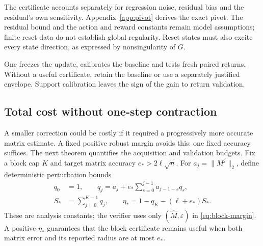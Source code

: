 \documentclass[twocolumn,nameyear]{autart}
\begin{document}
The certificate accounts separately for regression noise, residual bias
and the residual's own sensitivity. Appendix~\ref{app:pivot} derives
the exact pivot. The residual bound and the action and reward constants
remain model assumptions; finite reset data do not establish global
regularity. Reset states must also excite every state direction, as
expressed by nonsingularity of $G$.

One freezes the update, calibrates the baseline and tests fresh paired
returns. Without a useful certificate, retain the baseline or use a
separately justified envelope. Support calibration leaves the sign of
the gain to return validation.

\subsection{Total cost without one-step contraction}
A smaller correction could be costly if it required a progressively
more accurate matrix estimate. A fixed positive robust margin avoids
this: one fixed accuracy suffices. The next theorem quantifies the
acquisition and validation budgets. Fix a block cap $K$ and target matrix accuracy
$e_*>2\ell\sqrt n$. For $a_j=\|M^j\|_2$, define deterministic
perturbation bounds
\begin{align}\label{eq:q-powers}
 q_0&=1,\qquad
 q_j=a_j+e_*\sum_{s=0}^{j-1}a_{j-1-s}q_s,\nonumber\\
 S_*&=\sum_{j=0}^{K-1}q_j,\qquad
 \eta_*=1-q_K-(\ell+e_*)S_*.
\end{align}
These are analysis constants; the verifier uses only
$(\widehat M,\widehat\varepsilon)$ in \eqref{eq:block-margin}.
A positive $\eta_*$ guarantees that the block certificate remains useful
when both matrix error and its reported radius are at most $e_*$.
\end{document}
